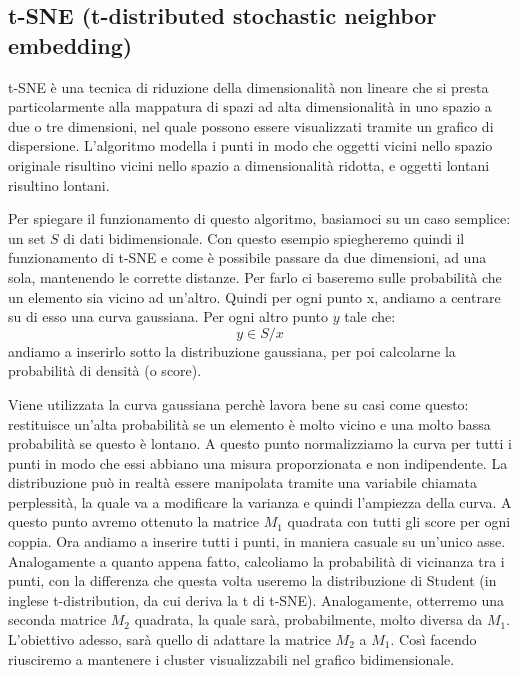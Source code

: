 \documentclass[12pt,italian]{report}
\begin{document}
\pagebreak

\subsection{t-SNE (t-distributed stochastic neighbor embedding)}
t-SNE è una tecnica di riduzione della dimensionalità non lineare che si presta particolarmente alla mappatura di spazi ad alta dimensionalità in uno spazio a due o tre dimensioni, nel quale possono essere visualizzati tramite un grafico di dispersione. L'algoritmo modella i punti in modo che oggetti vicini nello spazio originale risultino vicini nello spazio a dimensionalità ridotta, e oggetti lontani risultino lontani.

Per spiegare il funzionamento di questo algoritmo, basiamoci su un caso semplice: un set $S$ di dati bidimensionale. Con questo esempio spiegheremo quindi il funzionamento di t-SNE e come è possibile passare da due dimensioni, ad una sola, mantenendo le corrette distanze. Per farlo ci baseremo sulle probabilità che un elemento sia vicino ad un'altro. Quindi per ogni punto x, andiamo a centrare su di esso una curva gaussiana. Per ogni altro punto $ y $  tale che:
\[ y \in S / x \]
andiamo a inserirlo sotto la distribuzione gaussiana, per poi calcolarne la probabilità di densità (o score).

Viene utilizzata la curva gaussiana perchè lavora bene su casi come questo: restituisce un'alta probabilità se un elemento è molto vicino e una molto bassa probabilità se questo è lontano. A questo punto normalizziamo la curva per tutti i punti in modo che essi abbiano una misura proporzionata e non indipendente. La distribuzione può in realtà essere manipolata tramite una variabile chiamata perplessità, la quale va a modificare la varianza e quindi l'ampiezza della curva.
A questo punto avremo ottenuto la matrice $ M_{1} $ quadrata con tutti gli score per ogni coppia. Ora andiamo a inserire tutti i punti, in maniera casuale su un'unico asse. Analogamente a quanto appena fatto, calcoliamo la probabilità di vicinanza tra i punti, con la differenza che questa volta useremo la distribuzione di Student (in inglese t-distribution, da cui deriva la t di t-SNE). Analogamente, otterremo una seconda matrice $ M_{2} $ quadrata, la quale sarà, probabilmente, molto diversa da $ M_{1} $. L'obiettivo adesso, sarà quello di adattare la matrice $ M_{2} $ a $ M_{1} $. Così facendo riusciremo a mantenere i cluster visualizzabili nel grafico bidimensionale.
\end{document}
